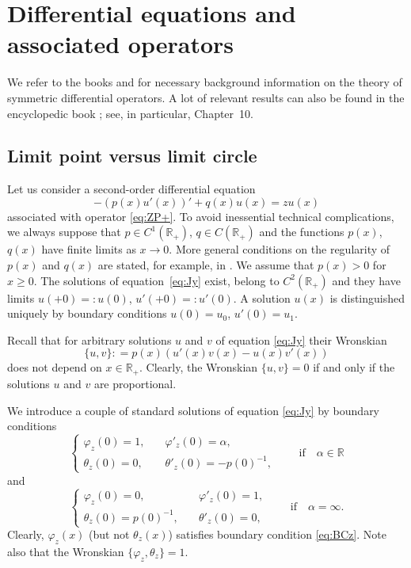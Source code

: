 \documentclass[pdftex]{sigma}%
\numberwithin{equation}{section}
\begin{document}
\section{Differential equations and associated operators}\label{section2}

 We refer to the books \cite[Section~17]{Nai} and \cite[Section~X.1]{RS} for necessary background information on the theory of symmetric differential operators. A lot of relevant results can also be found in the encyclopedic book \cite{Zettl};
 see, in particular, Chapter~10.

\subsection{Limit point versus limit circle}\label{section2.1}

Let us consider a second-order differential equation
\begin{equation}
- (p(x) u' (x))' + q(x) u(x)=z u(x)
 \label{eq:Jy}\end{equation}
 associated with operator \eqref{eq:ZP+}. To avoid inessential technical complications, we
 always suppose that $ p \in C^1 ({\mathbb R}_{+})$, $ q \in C ({\mathbb R}_{+})$ and the functions $p(x)$, $q(x)$ have finite limits as $x\to 0$.
 More general conditions on the regularity of $p(x)$ and $q(x)$ are stated, for example, in \cite[Section~15]{Nai}. We assume that $p(x)> 0$ for $x\geq 0$. The solutions of equation~\eqref{eq:Jy} exist, belong to $C^2 ({\mathbb R}_{+})$ and they have limits $u(+0)= : u(0)$, $u'(+0)= : u'(0)$. A solution $u(x)$ is distinguished uniquely by boundary conditions $u(0)=u_{0}$, $u'(0)=u_{1}$.

Recall that for arbitrary solutions $u$ and $v$ of equation \eqref{eq:Jy} their Wronskian
 \[
\{ u, v \} : = p(x) (u' (x) v (x)- u (x) v' (x))
\]
does not depend on $x\in{\mathbb R}_{+}$. Clearly, the Wronskian $\{ u, v \} =0$ if and only if the solutions $u$ and $v$ are proportional.

We introduce a couple of standard solutions of equation \eqref{eq:Jy} by boundary conditions
 \begin{equation}
 \begin{cases}
\varphi_{z}(0)= 1,&\quad \varphi'_{z}(0)=\alpha,
\\
\theta_{z}(0)= 0,& \quad \theta'_{z}(0)=- p(0)^{-1},
 \end{cases} \qquad \mbox{if} \quad \alpha\in{\mathbb R}
 \label{eq:Pz}\end{equation}
 and
 \begin{equation}
 \begin{cases}
\varphi_{z}(0)= 0,&\quad \varphi'_{z}(0)=1,
\\
\theta_{z}(0)= p(0)^{-1},&\quad \theta'_{z}(0)= 0,
 \end{cases} \qquad \mbox{if}\quad \alpha=\infty.
\label{eq:Pzi}\end{equation}
 Clearly, $\varphi_{z} (x)$ (but not $\theta_{z} (x)$) satisfies boundary condition \eqref{eq:BCz}. Note also that the Wronskian
 $\{\varphi_{z}, \theta_{z}\}=1$.
\end{document}
